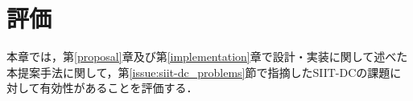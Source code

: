 \chapter{評価}
\label{evaluation}
本章では，第\ref{proposal}章及び第\ref{implementation}章で設計・実装に関して述べた本提案手法に関して，第\ref{issue:siit-dc_problems}節で指摘したSIIT-DCの課題に対して有効性があることを評価する．









